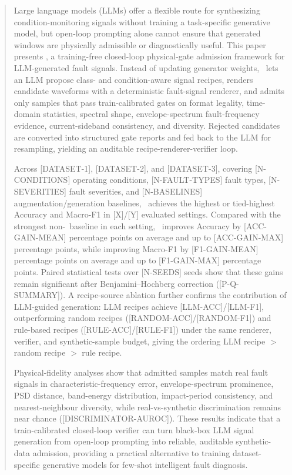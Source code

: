 \begin{abstract}
Large language models (LLMs) offer a flexible route for synthesizing
condition-monitoring signals without training a task-specific generative
model, but open-loop prompting alone cannot ensure that generated windows are
physically admissible or diagnostically useful. This paper presents \breeze, a
training-free closed-loop physical-gate admission framework for LLM-generated
fault signals. Instead of updating generator weights, \breeze\ lets an LLM
propose class- and condition-aware signal recipes, renders candidate
waveforms with a deterministic fault-signal renderer, and admits only samples
that pass train-calibrated gates on format legality, time-domain statistics,
spectral shape, envelope-spectrum fault-frequency evidence, current-sideband
consistency, and diversity. Rejected candidates are converted into structured
gate reports and fed back to the LLM for resampling, yielding an auditable
recipe-renderer-verifier loop.

Across [DATASET-1], [DATASET-2], and [DATASET-3], covering [N-CONDITIONS]
operating conditions, [N-FAULT-TYPES] fault types, [N-SEVERITIES] fault
severities, and [N-BASELINES] augmentation/generation baselines, \breeze\
achieves the highest or tied-highest Accuracy and Macro-F1 in
[X]/[Y] evaluated settings. Compared with the strongest non-\breeze\ baseline
in each setting, \breeze\ improves Accuracy by [ACC-GAIN-MEAN] percentage
points on average and up to [ACC-GAIN-MAX] percentage points, while improving
Macro-F1 by [F1-GAIN-MEAN] percentage points on average and up to
[F1-GAIN-MAX] percentage points. Paired statistical tests over [N-SEEDS] seeds
show that these gains remain significant after Benjamini--Hochberg correction
([P-Q-SUMMARY]). A recipe-source ablation further confirms the contribution of
LLM-guided generation: LLM recipes achieve [LLM-ACC]/[LLM-F1], outperforming
random recipes ([RANDOM-ACC]/[RANDOM-F1]) and rule-based recipes
([RULE-ACC]/[RULE-F1]) under the same renderer, verifier, and synthetic-sample
budget, giving the ordering LLM recipe $>$ random recipe $>$ rule recipe.

Physical-fidelity analyses show that admitted samples match real fault signals
in characteristic-frequency error, envelope-spectrum prominence, PSD distance,
band-energy distribution, impact-period consistency, and nearest-neighbour
diversity, while real-vs-synthetic discrimination remains near chance
([DISCRIMINATOR-AUROC]). These results indicate that a train-calibrated
closed-loop verifier can turn black-box LLM signal generation from open-loop
prompting into reliable, auditable synthetic-data admission, providing a
practical alternative to training dataset-specific generative models for
few-shot intelligent fault diagnosis.
\end{abstract}
